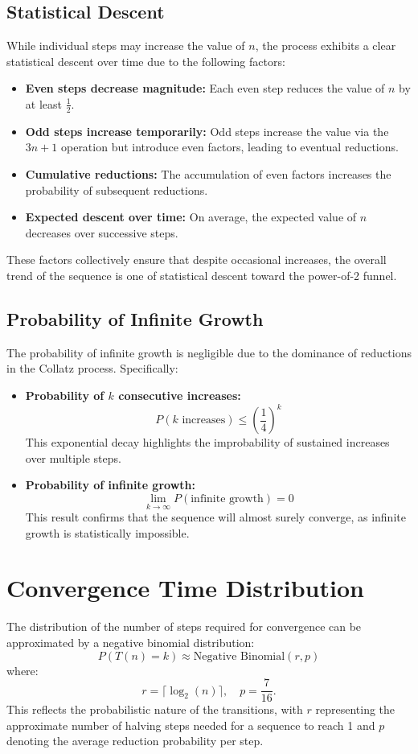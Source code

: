 \documentclass{article}
\begin{document}
\subsection{Statistical Descent}
While individual steps may increase the value of $n$, the process exhibits a clear statistical descent over time due to the following factors:
\begin{itemize}
    \item \textbf{Even steps decrease magnitude:} Each even step reduces the value of $n$ by at least $\frac{1}{2}$.
    \item \textbf{Odd steps increase temporarily:} Odd steps increase the value via the $3n + 1$ operation but introduce even factors, leading to eventual reductions.
    \item \textbf{Cumulative reductions:} The accumulation of even factors increases the probability of subsequent reductions.
    \item \textbf{Expected descent over time:} On average, the expected value of $n$ decreases over successive steps.
\end{itemize}
These factors collectively ensure that despite occasional increases, the overall trend of the sequence is one of statistical descent toward the power-of-2 funnel.

\subsection{Probability of Infinite Growth}
The probability of infinite growth is negligible due to the dominance of reductions in the Collatz process. Specifically:
\begin{itemize}
    \item \textbf{Probability of $k$ consecutive increases:}
    \[
    P(k \text{ increases}) \leq \left(\frac{1}{4}\right)^k
    \]
    This exponential decay highlights the improbability of sustained increases over multiple steps.
    \item \textbf{Probability of infinite growth:}
    \[
    \lim_{k \to \infty} P(\text{infinite growth}) = 0
    \]
    This result confirms that the sequence will almost surely converge, as infinite growth is statistically impossible.
\end{itemize}

\section{Convergence Time Distribution}
The distribution of the number of steps required for convergence can be approximated by a negative binomial distribution:
\[
P(T(n) = k) \approx \text{Negative Binomial}(r, p)
\]
where:
\[
r = \lceil \log_2(n) \rceil, \quad p = \frac{7}{16}.
\]
This reflects the probabilistic nature of the transitions, with $r$ representing the approximate number of halving steps needed for a sequence to reach 1 and $p$ denoting the average reduction probability per step.
\end{document}
